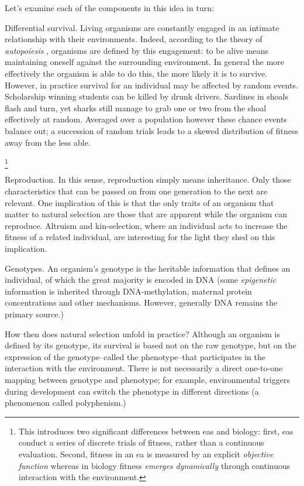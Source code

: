 Let's examine each of the components in this idea in turn:

Differential survival. Living organisms are constantly engaged in an
intimate relationship with their environments. Indeed, according to the
theory of \emph{autopoiesis} \autocite{Varela:1974qd}, organisms are
defined by this engagement: to be alive means maintaining oneself
against the surrounding environment. In general the more effectively the
organism is able to do this, the more likely it is to survive. However,
in practice survival for an individual may be affected by random events.
Scholarship winning students can be killed by drunk drivers. Sardines in
shoals flash and turn, yet sharks still manage to grab one or two from
the shoal effectively at random. Averaged over a population however
these chance events balance out; a succession of random trials leads to
a skewed distribution of fitness away from the less able.

\footnote{This introduces two significant differences between \glspl{ea}
	and biology: first, \glspl{ea} conduct a series of discrete trials of fitness,
	rather than a continuous evaluation. Second, fitness in an \gls{ea} is
	measured by an explicit \emph{objective function} whereas in biology
	fitness \emph{emerges dynamically} through continuous interaction with
the environment.}

Reproduction. In this sense, reproduction simply means inheritance. Only
those characteristics that can be passed on from one generation to the
next are relevant. One implication of this is that the only traits of an
organism that matter to natural selection are those that are apparent
while the organism can reproduce. Altruism and kin-selection, where an
individual acts to increase the fitness of a related individual, are
interesting for the light they shed on this implication.

Genotypes. An organism's \gls{genotype} is the heritable information
that defines an individual, of which the great majority is encoded in
DNA (some \emph{epigenetic} information is inherited through
DNA-methylation, maternal protein concentrations and other mechanisms.
However, generally DNA remains the primary source.)

How then does natural selection unfold in practice? Although an organism
is defined by its genotype, its survival is based not on the raw
genotype, but on the expression of the genotype--called the
\gls{phenotype}--that participates in the interaction with the
environment. There is not necessarily a direct one-to-one mapping
between genotype and phenotype; for example, environmental triggers
during development can switch the phenotype in different directions (a
phenomenon called \gls{polyphenism}.)


